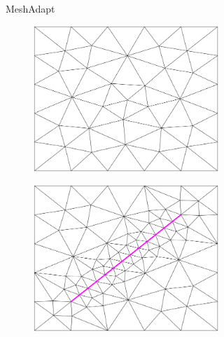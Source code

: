 \begin{figure}[p]
\begin{subfigure}[b]{\textwidth}
\begin{subfigure}[b]{0.32\textwidth}
        \end{subfigure}
        \caption{MeshAdapt}
        \label{fig:Gmsh-MeshAdapt}
    \end{subfigure}
    \begin{subfigure}[b]{\textwidth}
    \centering
        \begin{subfigure}[b]{0.32\textwidth}
            \centering
            \includegraphics[width=\textwidth]{report/Images/Software/Gmsh meshing algorithms/gmsh_meshing_algorithms_delaunay.png}
        \end{subfigure}
        \begin{subfigure}[b]{0.32\textwidth}
            \centering
            \includegraphics[width=\textwidth]{report/Images/Software/Gmsh meshing algorithms/gmsh_meshing_algorithms_embedded_delaunay.png}

\end{subfigure}
\end{subfigure}
\end{figure}
